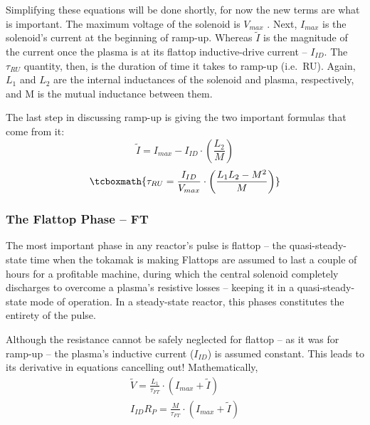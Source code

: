Simplifying these equations will be done shortly, for now the new terms are what is important. The maximum voltage of the solenoid is $V_{max}$ . Next, $I_{max}$ is the solenoid's current at the beginning of ramp-up. Whereas $\tilde I$ is the magnitude of the current once the plasma is at its flattop inductive-drive current -- $I_{ID}$. The $\tau_{RU}$ quantity, then, is the duration of time it takes to ramp-up (i.e.\ RU). Again, $L_1$ and $L_2$ are the  internal inductances of the solenoid and plasma, respectively, and M is the mutual inductance between them.

The last step in discussing ramp-up is giving the two important formulas that come from it:
\begin{equation}
	\label{eq:itilde}
	\tilde I = I_{max} - I_{ID} \cdot \left( \frac{L_2}{M} \right)
\end{equation}
\begin{equation}
	\label{eq:tauru}
	\tcboxmath{
	\tau_{RU} = \frac{I_{ID}}{V_{max}} \cdot \left( \frac{ L_1 L_2 - M^2 }{ M } \right)
	}
\end{equation}

\subsubsection{The Flattop Phase -- FT}

The most important phase in any reactor's pulse is flattop -- the quasi-steady-state time when the tokamak is making  Flattops are assumed to last a couple of hours for a profitable machine, during which the central solenoid completely discharges to overcome a plasma's resistive losses -- keeping it in a quasi-steady-state mode of operation. In a steady-state reactor, this phases constitutes the entirety of the pulse.

Although the resistance cannot be safely neglected for flattop -- as it was for ramp-up -- the plasma's inductive current ($I_{ID}$) is assumed constant. This leads to its derivative in equations cancelling out! Mathematically,
\begin{align}
	\tilde V = \frac{L_1}{\tau_{FT}} \cdot \left( I_{max} + \tilde I \right) \\
	I_{ID} R_P = \frac{M}{\tau_{FT}} \cdot \left( I_{max} + \tilde I \right)
\end{align}

